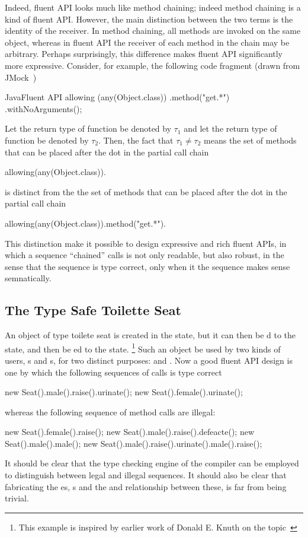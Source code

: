 Indeed, fluent API looks much like method chaining; indeed method chaining is a kind 
  of fluent API. 
However, the main distinction between the two terms is the identity of the receiver.
In method chaining, all methods are invoked on the same object, whereas in fluent API
  the receiver of each method in the chain may be arbitrary. 
Perhaps surprisingly, this difference makes fluent API significantly more expressive.
Consider, for example, the following code fragment (drawn from JMock~\cite{Freeman:Pryce:06}) 
\begin{lCode}{Java}{Fluent API}
allowing (any(Object.class))
  .method("get.*")
  .withNoArguments();
\end{lCode}
Let the return type of function  be denoted by $\tau_1$ and let the return type of function  be denoted by $\tau_2$. 
Then, the fact that $\tau_1 \ne \tau_2$ means the set of methods that can be placed after the dot 
in the partial call chain
\begin{lcode}
   allowing(any(Object.class)). 
\end{lcode}
is distinct from the the set of methods that can be placed after the dot in the partial call chain
\begin{lcode}
  allowing(any(Object.class)).method("get.*").
\end{lcode}
This distinction make it possible to design expressive and rich fluent APIs, in which a sequence ``chained'' calls is not only readable, but also
robust, in the sense that the sequence is type correct, only when it the sequence makes sense semnatically. 

\subsection{The Type Safe Toilette Seat}

An object of type toilete seat is created in the  state, but it can then be d to the  state, and 
	then be ed to the  state. \footnote{
This example is inspired by earlier work of Donald E. Knuth on the topic~\cite{Knuth:92}}
Such an object be used by two kinds of users, s and s, for two distinct purposes:  and .
Now a good fluent API design is one by which the following sequences of calls is type correct
\begin{lcode}
  new Seat().male().raise().urinate();
  new Seat().female().urinate();
 \end{lcode}
whereas the following sequence of method calls are illegal:
\begin{lcode}
   new Seat().female().raise();
   new Seat().male().raise().defeacte();
   new Seat().male().male();
   new Seat().male().raise().urinate().male().raise();
 \end{lcode}
It should be clear that the type checking engine of the compiler can 
be employed to distinguish between legal and illegal sequences.
It should also be clear that fabricating the es, s 
and the  and  relationship between these, is
far from being trivial. 

